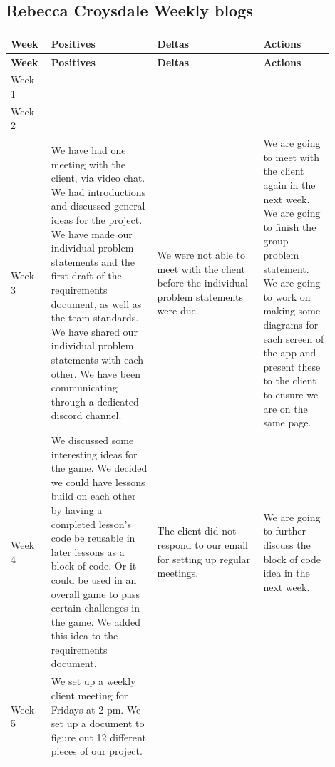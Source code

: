 \documentclass[draftclsnofoot,10pt,onecolumn]{IEEEtran}
\begin{document}
\subsection{Rebecca Croysdale Weekly blogs}        \begin{longtable}{p{0.1\linewidth}p{0.3\linewidth}p{0.3\linewidth}p{0.2\linewidth}}
        \hline
            \textbf{Week}
             & \textbf{Positives}
             & \textbf{Deltas}
             & \textbf{Actions}\\
             \hline
             \endfirsthead
             \textbf{Week}
             & \textbf{Positives}
             & \textbf{Deltas}
             & \textbf{Actions}\\
             \hline
            \endhead
             Week 1
             & ------
             & ------
             & ------\\
             \hline
             Week 2
             & ------
             & ------
             & ------\\
             \hline
             Week 3
             & We have had one meeting with the client, via video chat. We had introductions and discussed general ideas for the project. We have made our individual problem statements and the first draft of the requirements document, as well as the team standards. We have shared our individual problem statements with each other. We have been communicating through a dedicated discord channel.
             & We were not able to meet with the client before the individual problem statements were due.
             & We are going to meet with the client again in the next week. We are going to finish the group problem statement. We are going to work on making some diagrams for each screen of the app and present these to the client to ensure we are on the same page.\\
            \hline
             Week 4
             & We discussed some interesting ideas for the game. We decided we could have lessons build on each other by having a completed lesson's code be reusable in later lessons as a block of code. Or it could be used in an overall game to pass certain challenges in the game. We added this idea to the requirements document.
             & The client did not respond to our email for setting up regular meetings.
             & We are going to further discuss the block of code idea in the next week.\\
            \hline
             Week 5
             & We set up a weekly client meeting for Fridays at 2 pm. We set up a document to figure out 12 different pieces of our project.

\end{longtable}
\end{document}
